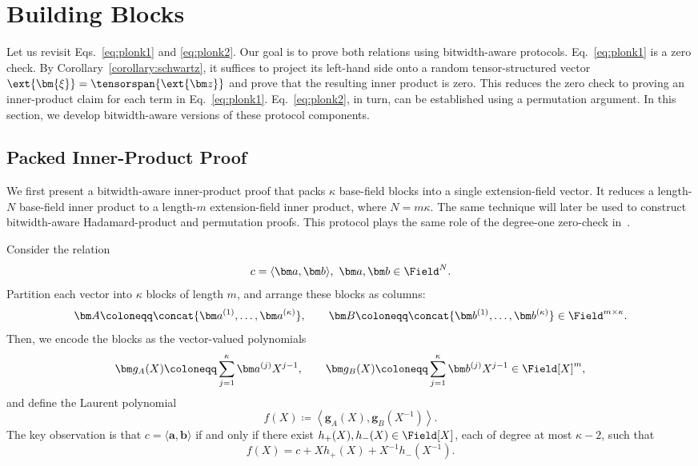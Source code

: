 \section{Building Blocks}
\label{sec:blocks}

Let us revisit Eqs.~\eqref{eq:plonk1} and \eqref{eq:plonk2}.
Our goal is to prove both relations using bitwidth-aware protocols.
Eq.~\eqref{eq:plonk1} is a zero check. By Corollary~\ref{corollary:schwartz}, it suffices to project its
left-hand side onto a random tensor-structured vector
\(
    \ext{\bm{\xi}}
    =
    \tensorspan{\ext{\bm z}}
\)
and prove that the resulting inner product is zero. This reduces
the zero check to proving an inner-product claim for each term in
Eq.~\eqref{eq:plonk1}. Eq.~\eqref{eq:plonk2}, in turn, can
be established using a permutation argument. In this section, we
develop bitwidth-aware versions of these protocol components.

\subsection{Packed Inner-Product Proof}
\label{sec:ip}

We first present a bitwidth-aware inner-product proof that packs
\(\kappa\) base-field blocks into a single extension-field vector.
It reduces a length-\(N\) base-field inner product to a
length-\(m\) extension-field inner product, where \(N=m\kappa\).
The same technique will later be used to construct bitwidth-aware
Hadamard-product and permutation proofs. This protocol plays the
same role of the degree-one zero-check in~\cite{iacr/DaoT24}.

Consider the relation
\[
    c=\langle\bm a,\bm b\rangle,
    ~
    \bm a,\bm b\in\Field^N.
\]
Partition each vector into \(\kappa\) blocks of length \(m\), and
arrange these blocks as columns:
\begin{equation}
\label{eq:matAB}
    \bm A
    \coloneqq
    \concat{
        \bm a^{(1)},\ldots,\bm a^{(\kappa)}
    },
    \qquad
    \bm B
    \coloneqq
    \concat{
        \bm b^{(1)},\ldots,\bm b^{(\kappa)}
    }
    \in\Field^{m\times\kappa}.
\end{equation}
Then, we encode the blocks as the vector-valued polynomials
\[
    \bm g_A(X)
    \coloneqq
    \sum_{j=1}^{\kappa}\bm a^{(j)}X^{j-1},
    \qquad
    \bm g_B(X)
    \coloneqq
    \sum_{j=1}^{\kappa}\bm b^{(j)}X^{j-1}
    \in\Field[X]^m,
\]
and define the Laurent polynomial
\begin{equation}
    f(X)
    \coloneqq
    \left\langle
        \bm g_A(X),\bm g_B(X^{-1})
    \right\rangle.
\label{eq:ip-laurent-polynomial}
\end{equation}
The key observation is that
\(c=\langle\bm a,\bm b\rangle\) if and only if there exist
\(h_+(X),h_-(X)\in\Field[X]\), each of degree at most
\(\kappa-2\), such that
\begin{equation}
    f(X)
    =
    c
    +Xh_+(X)
    +X^{-1}h_-(X^{-1}).
\label{eq:ip-correction-identity}
\end{equation}

